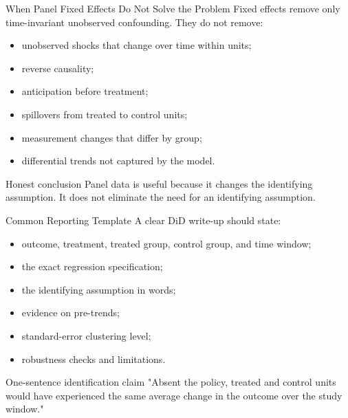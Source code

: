 \documentclass[11pt,aspectratio=169]{beamer}
\begin{document}
\begin{frame}{When Panel Fixed Effects Do Not Solve the Problem}
  Fixed effects remove only time-invariant unobserved confounding.
  They do not remove:
  \begin{itemize}
    \item unobserved shocks that change over time within units;
    \item reverse causality;
    \item anticipation before treatment;
    \item spillovers from treated to control units;
    \item measurement changes that differ by group;
    \item differential trends not captured by the model.
  \end{itemize}
  \begin{block}{Honest conclusion}
    Panel data is useful because it changes the identifying assumption. It does not eliminate the need for an identifying assumption.
  \end{block}
\end{frame}

\begin{frame}{Common Reporting Template}
  A clear DiD write-up should state:
  \begin{itemize}
    \item outcome, treatment, treated group, control group, and time window;
    \item the exact regression specification;
    \item the identifying assumption in words;
    \item evidence on pre-trends;
    \item standard-error clustering level;
    \item robustness checks and limitations.
  \end{itemize}
  \begin{block}{One-sentence identification claim}
    "Absent the policy, treated and control units would have experienced the same average change in the outcome over the study window."
  \end{block}
\end{frame}
\end{document}
